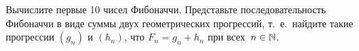 \documentclass[a4paper,12pt]{article}
\begin{document}
 Вычислите первые 10 чисел Фибоначчи.
 Представьте последовательность Фибоначчи в виде
суммы двух геометричес\-ких прогрессий,
т.~е.~найдите такие прогрессии $(g_n)$ и $(h_n)$, что $F_n=g_n+h_n$ при
всех~\hbox{$n\in\mathbb{N}$.}  %





\vspace*{-4mm}




\end{document}
